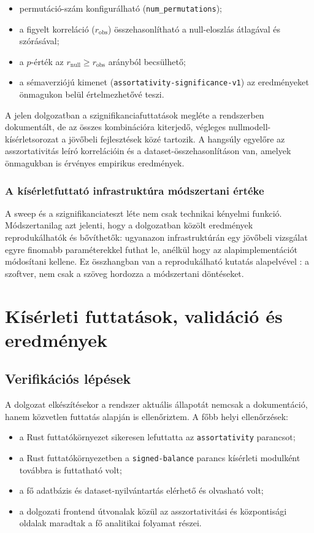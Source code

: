 ﻿\documentclass[a4paper,12pt]{report}
\begin{document}
\begin{itemize}
    \item permutáció-szám konfigurálható (\texttt{num\_permutations});
    \item a figyelt korreláció ($r_\mathrm{obs}$) összehasonlítható a null-eloszlás átlagával és szórásával;
    \item a $p$-érték az $r_\mathrm{null} \geq r_\mathrm{obs}$ arányból becsülhető;
    \item a sémaverziójú kimenet (\texttt{assortativity-significance-v1}) az eredményeket önmagukon belül értelmezhetővé teszi.
\end{itemize}

A jelen dolgozatban a szignifikanciafuttatások megléte a rendszerben dokumentált, de az összes kombinációra kiterjedő, végleges nullmodell-kísérletsorozat a jövőbeli fejlesztések közé tartozik. A hangsúly egyelőre az asszortativitás leíró korrelációin és a dataset-összehasonlításon van, amelyek önmagukban is érvényes empirikus eredmények.

\subsection{A kísérletfuttató infrastruktúra módszertani értéke}

A sweep és a szignifikanciateszt léte nem csak technikai kényelmi funkció. Módszertanilag azt jelenti, hogy a dolgozatban közölt eredmények reprodukálhatók és bővíthetők: ugyanazon infrastruktúrán egy jövőbeli vizsgálat egyre finomabb paraméterekkel futhat le, anélkül hogy az alapimplementációt módosítani kellene. Ez összhangban van a reprodukálható kutatás alapelvével \cite{sandve2013}: a szoftver, nem csak a szöveg hordozza a módszertani döntéseket.

\chapter{Kísérleti futtatások, validáció és eredmények}

\section{Verifikációs lépések}

A dolgozat elkészítésekor a rendszer aktuális állapotát nemcsak a dokumentáció, hanem közvetlen futtatás alapján is ellenőriztem. A főbb helyi ellenőrzések:

\begin{itemize}
    \item a Rust futtatókörnyezet sikeresen lefuttatta az \texttt{assortativity} parancsot;
    \item a Rust futtatókörnyezetben a \texttt{signed-balance} parancs kísérleti modulként továbbra is futtatható volt;
    \item a fő adatbázis és dataset-nyilvántartás elérhető és olvasható volt;
    \item a dolgozati frontend útvonalak közül az asszortativitási és központisági oldalak maradtak a fő analitikai folyamat részei.
\end{itemize}
\end{document}
